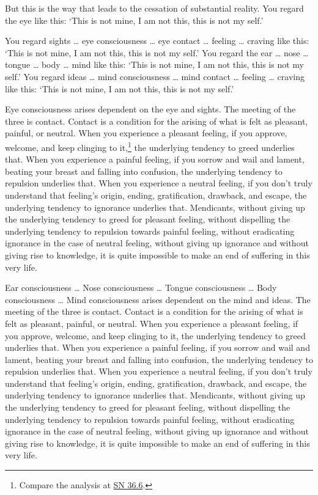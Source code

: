 \documentclass[12pt,openany]{book}%
\begin{document}
But this is the way that leads to the cessation of substantial reality. You regard the eye like this: ‘This is not mine, I am not this, this is not my self.’ 

You regard sights … eye consciousness … eye contact … feeling … craving like this: ‘This is not mine, I am not this, this is not my self.’ You regard the ear … nose … tongue … body … mind like this: ‘This is not mine, I am not this, this is not my self.’ You regard ideas … mind consciousness … mind contact … feeling … craving like this: ‘This is not mine, I am not this, this is not my self.’ 

Eye consciousness arises dependent on the eye and sights. The meeting of the three is contact. Contact is a condition for the arising of what is felt as pleasant, painful, or neutral. When you experience a pleasant feeling, if you approve, welcome, and keep clinging to it,\footnote{Compare the analysis at \href{https://suttacentral.net/sn36.6/en/sujato}{SN 36.6}. } the underlying tendency to greed underlies that. When you experience a painful feeling, if you sorrow and wail and lament, beating your breast and falling into confusion, the underlying tendency to repulsion underlies that. When you experience a neutral feeling, if you don’t truly understand that feeling’s origin, ending, gratification, drawback, and escape, the underlying tendency to ignorance underlies that. Mendicants, without giving up the underlying tendency to greed for pleasant feeling, without dispelling the underlying tendency to repulsion towards painful feeling, without eradicating ignorance in the case of neutral feeling, without giving up ignorance and without giving rise to knowledge, it is quite impossible to make an end of suffering in this very life. 

Ear consciousness … Nose consciousness … Tongue consciousness … Body consciousness … Mind consciousness arises dependent on the mind and ideas. The meeting of the three is contact. Contact is a condition for the arising of what is felt as pleasant, painful, or neutral. When you experience a pleasant feeling, if you approve, welcome, and keep clinging to it, the underlying tendency to greed underlies that. When you experience a painful feeling, if you sorrow and wail and lament, beating your breast and falling into confusion, the underlying tendency to repulsion underlies that. When you experience a neutral feeling, if you don’t truly understand that feeling’s origin, ending, gratification, drawback, and escape, the underlying tendency to ignorance underlies that. Mendicants, without giving up the underlying tendency to greed for pleasant feeling, without dispelling the underlying tendency to repulsion towards painful feeling, without eradicating ignorance in the case of neutral feeling, without giving up ignorance and without giving rise to knowledge, it is quite impossible to make an end of suffering in this very life. 
\end{document}
